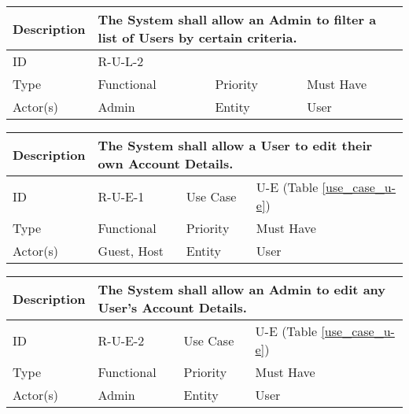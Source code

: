 \begin{tabular}{|p{1.5cm}|p{1.5cm}|p{1.5cm}|p{1.5cm}|p{1.5cm}|p{1.5cm}|p{1.5cm}|p{1.5cm}|p{1.5cm}|p{1.5cm}|p{1.5cm}|p{1.5cm}|}
    \hline
    \multicolumn{2}{|o|}{Description} & \multicolumn{10}{p{12.5cm}|}{The System shall allow an Admin to filter a list of Users by certain criteria.} \\ \hline
    \multicolumn{2}{|o|}{ID}          & \multicolumn{10}{p{12.5cm}|}{R-U-L-2}  \\ \hline
    \multicolumn{2}{|o|}{Type}        & \multicolumn{4}{n}{Functional}         & \multicolumn{2}{|o|}{Priority}    & \multicolumn{4}{n|}{Must Have}  \\ \hline
    \multicolumn{2}{|o|}{Actor(s)}    & \multicolumn{4}{n}{Admin}              & \multicolumn{2}{|o|}{Entity}      & \multicolumn{4}{n|}{User} \\ \hline
\end{tabular}

\begin{tabular}{|p{1.5cm}|p{1.5cm}|p{1.5cm}|p{1.5cm}|p{1.5cm}|p{1.5cm}|p{1.5cm}|p{1.5cm}|p{1.5cm}|p{1.5cm}|p{1.5cm}|p{1.5cm}|}
    \hline
    \multicolumn{2}{|o|}{Description} & \multicolumn{10}{p{12.5cm}|}{The System shall allow a User to edit their own Account Details.} \\ \hline
    \multicolumn{2}{|o|}{ID}          & \multicolumn{4}{n}{R-U-E-1}            & \multicolumn{2}{|o|}{Use Case}    & \multicolumn{4}{n|}{U-E (Table \ref{use_case_u-e})} \\ \hline
    \multicolumn{2}{|o|}{Type}        & \multicolumn{4}{n}{Functional}         & \multicolumn{2}{|o|}{Priority}    & \multicolumn{4}{n|}{Must Have}  \\ \hline
    \multicolumn{2}{|o|}{Actor(s)}    & \multicolumn{4}{n}{Guest, Host}        & \multicolumn{2}{|o|}{Entity}      & \multicolumn{4}{n|}{User} \\ \hline
\end{tabular}



\begin{tabular}{|p{1.5cm}|p{1.5cm}|p{1.5cm}|p{1.5cm}|p{1.5cm}|p{1.5cm}|p{1.5cm}|p{1.5cm}|p{1.5cm}|p{1.5cm}|p{1.5cm}|p{1.5cm}|}
    \hline
    \multicolumn{2}{|o|}{Description} & \multicolumn{10}{p{12.5cm}|}{The System shall allow an Admin to edit any User's Account Details.} \\ \hline
    \multicolumn{2}{|o|}{ID}          & \multicolumn{4}{n}{R-U-E-2}            & \multicolumn{2}{|o|}{Use Case}    & \multicolumn{4}{n|}{U-E (Table \ref{use_case_u-e})} \\ \hline
    \multicolumn{2}{|o|}{Type}        & \multicolumn{4}{n}{Functional}         & \multicolumn{2}{|o|}{Priority}    & \multicolumn{4}{n|}{Must Have}  \\ \hline
    \multicolumn{2}{|o|}{Actor(s)}    & \multicolumn{4}{n}{Admin}              & \multicolumn{2}{|o|}{Entity}      & \multicolumn{4}{n|}{User} \\ \hline
\end{tabular}

